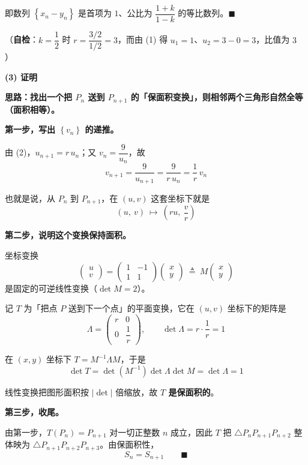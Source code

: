 即数列 $\left\{x_n-y_n\right\}$ 是首项为 $1$、公比为 $\dfrac{1+k}{1-k}$ 的等比数列。$\blacksquare$

（\textbf{自检}：$k=\dfrac12$ 时 $r=\dfrac{3/2}{1/2}=3$，而由 (1) 得 $u_1=1$、$u_2=3-0=3$，比值为 $3$ ）

\par\medskip

\textbf{(3) 证明}

\textbf{思路：找出一个把 $P_n$ 送到 $P_{n+1}$ 的「保面积变换」，则相邻两个三角形自然全等（面积相等）。}

\textbf{第一步，写出 $\left\{v_n\right\}$ 的递推。}

由 (2)，$u_{n+1}=r\,u_n$；又 $v_n=\dfrac9{u_n}$，故
\[v_{n+1}=\frac9{u_{n+1}}=\frac9{r\,u_n}=\frac1r\,v_n\]

也就是说，从 $P_n$ 到 $P_{n+1}$，在 $(u,v)$ 这套坐标下就是
\[(u,\ v)\ \longmapsto\ \left(ru,\ \frac vr\right)\]

\textbf{第二步，说明这个变换保持面积。}

坐标变换
\[\begin{pmatrix}u\\v\end{pmatrix}=\begin{pmatrix}1&-1\\1&1\end{pmatrix}\begin{pmatrix}x\\y\end{pmatrix}\ \triangleq\ M\begin{pmatrix}x\\y\end{pmatrix}\]
是固定的可逆线性变换（$\det M=2$）。

记 $T$ 为「把点 $P$ 送到下一个点」的平面变换，它在 $(u,v)$ 坐标下的矩阵是
\[\Lambda=\begin{pmatrix}r&0\\0&\dfrac1r\end{pmatrix},\qquad\det\Lambda=r\cdot\frac1r=1\]

在 $(x,y)$ 坐标下 $T=M^{-1}\Lambda M$，于是
\[\det T=\det\left(M^{-1}\right)\det\Lambda\det M=\det\Lambda=1\]

线性变换把图形面积按 $\left|\det\right|$ 倍缩放，故 \textbf{$T$ 是保面积的}。

\textbf{第三步，收尾。}

由第一步，$T\left(P_n\right)=P_{n+1}$ 对一切正整数 $n$ 成立，因此 $T$ 把 $\triangle P_nP_{n+1}P_{n+2}$ 整体映为 $\triangle P_{n+1}P_{n+2}P_{n+3}$。由保面积性，
\[S_n=S_{n+1}\qquad\blacksquare\]

